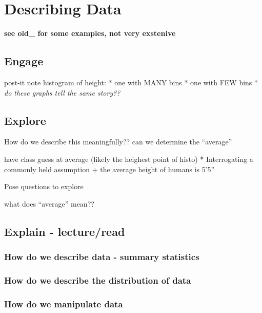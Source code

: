 \documentclass[
]{book}
\begin{document}
\hypertarget{describing-data}{%
\chapter{Describing Data}\label{describing-data}}

\textbf{see old\_ for some examples, not very exstenive}

\hypertarget{engage-2}{%
\section{Engage}\label{engage-2}}

post-it note histogram of height:
* one with MANY bins
* one with FEW bins
* \emph{do these graphs tell the same story??}

\hypertarget{explore-2}{%
\section{Explore}\label{explore-2}}

How do we describe this meaningfully??
can we determine the ``average''

have class guess at average (likely the heighest point of histo)
* Interrogating a commonly held assumption
+ the average height of humans is 5'5''

Pose questions to explore

what does ``average'' mean??

\hypertarget{explain---lectureread-1}{%
\section{Explain - lecture/read}\label{explain---lectureread-1}}

\hypertarget{how-do-we-describe-data---summary-statistics}{%
\subsection{How do we describe data - summary statistics}\label{how-do-we-describe-data---summary-statistics}}

\hypertarget{how-do-we-describe-the-distribution-of-data}{%
\subsection{How do we describe the distribution of data}\label{how-do-we-describe-the-distribution-of-data}}

\hypertarget{how-do-we-manipulate-data}{%
\subsection{How do we manipulate data}\label{how-do-we-manipulate-data}}
\end{document}

